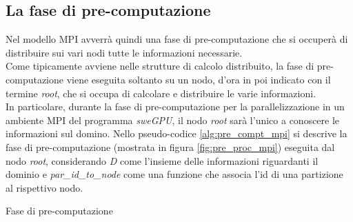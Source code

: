 \subsection{La fase di pre-computazione}
Nel modello MPI avverrà quindi una fase di pre-computazione che si occuperà di distribuire sui vari nodi tutte le informazioni necessarie.\\
Come tipicamente avviene nelle strutture di calcolo distribuito, la fase di pre-computazione viene eseguita soltanto su un nodo, d'ora in poi indicato con il termine \emph{root}, che si occupa di calcolare e distribuire le varie informazioni.\\
In particolare, durante la fase di pre-computazione per la parallelizzazione in un ambiente MPI del programma \textit{sweGPU}, il nodo \textit{root} sarà l'unico a conoscere le informazioni sul domino.
Nello pseudo-codice \ref{alg:pre_compt_mpi} si descrive la fase di pre-computazione (mostrata in figura \ref{fig:pre_proc_mpi}) eseguita dal nodo \textit{root}, considerando \textit{D} come l'insieme delle informazioni riguardanti il dominio e \textit{par\_id\_to\_node} come una funzione che associa l'id di una partizione al rispettivo nodo.
\begin{algorithm}[H]
	\caption{Fase di pre-computazione}
	\label{alg:pre_compt_mpi}
	\begin{algorithmic}[1]
		\Statex
		\State{\color{blue}{//Invio delle partizioni ai nodi relativi}}
		\Else
		\EndIf
		\EndFor
		\Else
		\EndIf
		\Else
		\EndIf
		\State \Return{}
		\EndFunction
	\end{algorithmic}
\end{algorithm}

